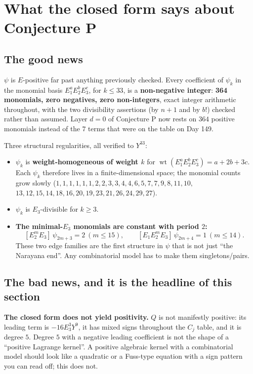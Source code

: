 \documentclass[11pt,a4paper]{article}
\DeclareMathOperator{\wt}{wt}
\theoremstyle{plain}
\theoremstyle{definition}
\begin{document}
\section{What the closed form says about Conjecture P}
\label{sec:conjP}

\subsection*{The good news}

$\psi$ is $E$-positive far past anything previously checked. Every coefficient of $\psi_k$ in
the monomial basis $E_1^aE_2^bE_3^c$, for $k\le33$, is a \textbf{non-negative integer}:
\textbf{364 monomials, zero negatives, zero non-integers}, exact integer arithmetic
throughout, with the two divisibility assertions (by $n+1$ and by $b!$) checked rather than
assumed. Layer $d=0$ of Conjecture P now rests on $364$ positive monomials instead of the
$7$ terms that were on the table on Day 149.

Three structural regularities, all verified to $Y^{33}$:
\begin{itemize}
\item $\psi_k$ is \textbf{weight-homogeneous of weight $k$} for $\wt(E_1^aE_2^bE_3^c)=a+2b+3c$.
Each $\psi_k$ therefore lives in a finite-dimensional space; the monomial counts grow slowly
($1,1,1,1,1,1,2,2,3,3,$\allowbreak $4,4,6,5,7,7,9,8,11,10,$\allowbreak $13,12,15,14,18,16,$\allowbreak $20,19,23,21,26,24,29,27$).
\item $\psi_k$ is $E_3$-divisible for $k\ge3$.
\item \textbf{The minimal-$E_3$ monomials are constant with period $2$:}
\[
[E_2^mE_3]\,\psi_{2m+3}=2\ (m\le15),\qquad [E_1E_2^mE_3]\,\psi_{2m+4}=1\ (m\le14).
\]
These two edge families are the first structure in $\psi$ that is not just ``the Narayana
end''. Any combinatorial model has to make them singletons/pairs.
\end{itemize}

\subsection*{The bad news, and it is the headline of this section}

\textbf{The closed form does not yield positivity.} $Q$ is not manifestly positive:
its leading term is $-16E_3^3Y^9$, it has mixed signs throughout the $C_j$ table, and it is
degree $5$. Degree $5$ with a negative leading coefficient is not the shape of a
``positive Lagrange kernel''. A positive algebraic kernel with a combinatorial model should
look like a quadratic or a Fuss-type equation with a sign pattern you can read off; this
does not.
\end{document}
